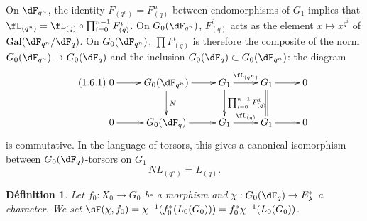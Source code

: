 \documentclass[oneside]{book}
\DeclareMathOperator{\gal}{Gal}
\newcounter{char}
\theoremstyle{sga-source}
\theoremstyle{sga-source-dash}
\theoremstyle{sga-source-dotdash}
\theoremstyle{sga-source-number-note-dash}
\theoremstyle{sga-source-note-number-dotdash}
\theoremstyle{sga-source-example-dotdash}
\theoremstyle{sga-source-inline-number}
\theoremstyle{sga-source-bare-number}
\theoremstyle{sga-source}
\newtheorem{definition_}[subsection]{Définition}
\begin{document}
On $\dF_{q^n}$, the identity $F_{(q^n)}=F_{(q)}^n$ between endomorphisms of 
$G_1$ implies that $\fL_{(q^n)}=\fL_{(q)}\circ \prod_{i=0}^{n-1} F_{(q)}^i$. 
On $G_0(\dF_{q^n})$, $F_{(q)}^i$ acts as the element 
$x\mapsto x^{q^i}$ of $\gal(\dF_{q^n}/\dF_q)$. On $G_0(\dF_{q^n})$, 
$\prod F_{(q)}^i$ is therefore the composite of the norm 
$G_0(\dF_{q^n})\to G_0(\dF_q)$ and the inclusion 
$G_0(\dF_q)\subset G_0(\dF_{q^n})$: the diagram 
\begin{equation*}\tag{1.6.1}\label{VI:eq:1-6-1}
\xymatrix{
  0 \ar[r] 
    & G_0(\dF_{q^n}) \ar[r] \ar[d]^-N 
    & G_1 \ar[r]^-{\fL_{(q^n)}} \ar[d]^-{\prod_{i=0}^{n-1} F_{(q)}^i} 
    & G_1 \ar[r] \ar@{=}[d] 
    & 0 \\
  0 \ar[r] 
    & G_0(\dF_q) \ar[r] 
    & G_1 \ar[r]^-{\fL_{(q)}} 
    & G_1 \ar[r] 
    & 0
}
\end{equation*}
is commutative. In the language of torsors, this gives a canonical isomorphism 
between $G_0(\dF_q)$-torsors on $G_1$ 
\begin{equation*}\tag{1.6.2}\label{VI:eq:1-6-2}
  N L_{(q^n)} = L_{(q)} \text{.}
\end{equation*}





\begin{definition_}\label{VI:1-7}
Let $f_0:X_0\to G_0$ be a morphism and 
$\chi:G_0(\dF_q)\to E_\lambda^\ast$ a character. We set 
$\sF(\chi,f_0) = \chi^{-1}(f_0^\ast (L_0(G_0))) = f_0^\ast\chi^{-1}(L_0(G_0))$. 
\end{definition_}
\end{document}
